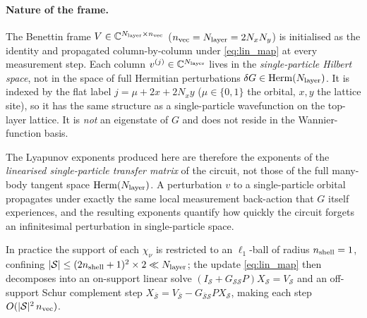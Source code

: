 \documentclass[aps,twocolumn,floatfix,superscriptaddress,nofootinbib]{revtex4-2}
\newcommand{\Nlayer}{N_{\rm layer}}
\begin{document}
\paragraph{Nature of the frame.}
The Benettin frame $V\in\mathbb{C}^{\Nlayer\times n_{\rm vec}}$
($n_{\rm vec}=\Nlayer=2N_xN_y$) is initialised as the identity and propagated
column-by-column under \eqref{eq:lin_map} at every measurement step.  Each
column $v^{(j)}\in\mathbb{C}^{\Nlayer}$ lives in the \emph{single-particle
Hilbert space}, not in the space of full Hermitian perturbations
$\delta G\in\mathrm{Herm}(\Nlayer)$.  It is indexed by the flat label
$j=\mu+2x+2N_x y$ ($\mu\in\{0,1\}$ the orbital, $x,y$ the lattice site), so
it has the same structure as a single-particle wavefunction on the top-layer
lattice.  It is \emph{not} an eigenstate of $G$ and does not reside in the
Wannier-function basis.

The Lyapunov exponents produced here are therefore the exponents of the
\emph{linearised single-particle transfer matrix} of the circuit, not those of
the full many-body tangent space $\mathrm{Herm}(\Nlayer)$.  A perturbation
$v$ to a single-particle orbital propagates under exactly the same local
measurement back-action that $G$ itself experiences, and the resulting
exponents quantify how quickly the circuit forgets an infinitesimal
perturbation in single-particle space.

In practice the support of each $\chi_\nu$ is restricted to an $\ell_1$-ball
of radius $n_{\rm shell}=1$, confining $|\mathcal{S}|\leq
(2n_{\rm shell}+1)^2\times 2\ll\Nlayer$; the update \eqref{eq:lin_map} then
decomposes into an on-support linear solve
$(I_\mathcal{S}+G_{\mathcal{S}\mathcal{S}}P)X_\mathcal{S}=V_\mathcal{S}$
and an off-support Schur complement step
$X_{\bar{\mathcal{S}}}=V_{\bar{\mathcal{S}}}-G_{\bar{\mathcal{S}}\mathcal{S}}PX_\mathcal{S}$,
making each step $O(|\mathcal{S}|^2\,n_{\rm vec})$.
\end{document}
